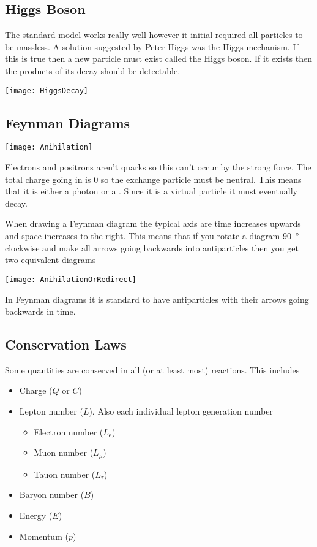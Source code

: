 \subsection*{Higgs Boson}

The standard model works really well however it initial required all particles to be massless. A solution suggested by Peter Higgs was the Higgs mechanism. If this is true then a new particle must exist called the Higgs boson. If it exists then the products of its decay should be detectable.

\begin{center}
\texttt{[image: HiggsDecay]}
\end{center}

\subsection*{Feynman Diagrams}

\begin{center}
\texttt{[image: Anihilation]}
\end{center}

Electrons and positrons aren't quarks so this can't occur by the strong force. The total charge going in is 0 so the exchange particle must be neutral. This means that it is either a photon or a \zboson. Since it is a virtual particle it must eventually decay.

When drawing a Feynman diagram the typical axis are time increases upwards and space increases to the right. This means that if you rotate a diagram \SI{90}{\degree} clockwise and make all arrows going backwards into antiparticles then you get two equivalent diagrams

\begin{center}
\texttt{[image: AnihilationOrRedirect]}
\end{center}

In Feynman diagrams it is standard to have antiparticles with their arrows going backwards in time.

\subsection*{Conservation Laws}

Some quantities are conserved in all (or at least most) reactions. This includes
\begin{itemize}
\item Charge (\(Q\) or \(C\))
\item Lepton number (\(L\)). Also each individual lepton generation number
\begin{itemize}
\item Electron number (\(L_\mathrm{e}\))
\item Muon number (\(L_\mu\))
\item Tauon number (\(L_\tau\))
\end{itemize}
\item Baryon number (\(B\))
\item Energy (\(E\))
\item Momentum (\(p\))
\end{itemize}

